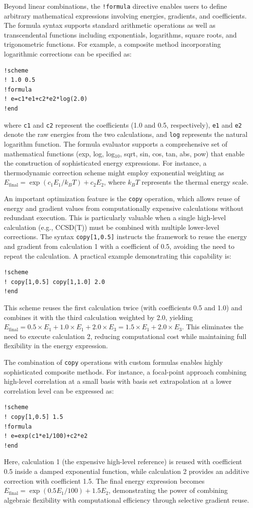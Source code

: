 Beyond linear combinations, the \texttt{!formula} directive enables users to define arbitrary mathematical expressions involving energies, gradients, and coefficients. The formula syntax supports standard arithmetic operations as well as transcendental functions including exponentials, logarithms, square roots, and trigonometric functions. For example, a composite method incorporating logarithmic corrections can be specified as:
\begin{verbatim}
!scheme
! 1.0 0.5
!formula
! e=c1*e1+c2*e2*log(2.0)
!end
\end{verbatim}
where \texttt{c1} and \texttt{c2} represent the coefficients (1.0 and 0.5, respectively), \texttt{e1} and \texttt{e2} denote the raw energies from the two calculations, and \texttt{log} represents the natural logarithm function. The formula evaluator supports a comprehensive set of mathematical functions (exp, log, log$_{10}$, sqrt, sin, cos, tan, abs, pow) that enable the construction of sophisticated energy expressions. For instance, a thermodynamic correction scheme might employ exponential weighting as $E_{\text{final}} = \exp(c_1 E_1 / k_B T) + c_2 E_2$, where $k_B T$ represents the thermal energy scale.

An important optimization feature is the \texttt{copy} operation, which allows reuse of energy and gradient values from computationally expensive calculations without redundant execution. This is particularly valuable when a single high-level calculation (e.g., CCSD(T)) must be combined with multiple lower-level corrections. The syntax \texttt{copy[1,0.5]} instructs the framework to reuse the energy and gradient from calculation 1 with a coefficient of 0.5, avoiding the need to repeat the calculation. A practical example demonstrating this capability is:
\begin{verbatim}
!scheme
! copy[1,0.5] copy[1,1.0] 2.0
!end
\end{verbatim}
This scheme reuses the first calculation twice (with coefficients 0.5 and 1.0) and combines it with the third calculation weighted by 2.0, yielding $E_{\text{final}} = 0.5 \times E_1 + 1.0 \times E_1 + 2.0 \times E_3 = 1.5 \times E_1 + 2.0 \times E_3$. This eliminates the need to execute calculation 2, reducing computational cost while maintaining full flexibility in the energy expression.

The combination of \texttt{copy} operations with custom formulas enables highly sophisticated composite methods. For instance, a focal-point approach combining high-level correlation at a small basis with basis set extrapolation at a lower correlation level can be expressed as:
\begin{verbatim}
!scheme
! copy[1,0.5] 1.5
!formula
! e=exp(c1*e1/100)+c2*e2
!end
\end{verbatim}
Here, calculation 1 (the expensive high-level reference) is reused with coefficient 0.5 inside a damped exponential function, while calculation 2 provides an additive correction with coefficient 1.5. The final energy expression becomes $E_{\text{final}} = \exp(0.5 E_1 / 100) + 1.5 E_2$, demonstrating the power of combining algebraic flexibility with computational efficiency through selective gradient reuse.


